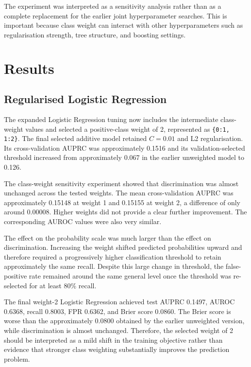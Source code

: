 \documentclass[11pt,a4paper]{article}
\begin{document}
The experiment was interpreted as a sensitivity analysis rather than as a complete replacement for the earlier joint hyperparameter searches. This is important because class weight can interact with other hyperparameters such as regularisation strength, tree structure, and boosting settings.

\section{Results}

\subsection{Regularised Logistic Regression}

The expanded Logistic Regression tuning now includes the intermediate class-weight values and selected a positive-class weight of 2, represented as \texttt{\{0:1, 1:2\}}. The final selected additive model retained $C=0.01$ and L2 regularisation. Its cross-validation AUPRC was approximately 0.1516 and its validation-selected threshold increased from approximately 0.067 in the earlier unweighted model to 0.126.

The class-weight sensitivity experiment showed that discrimination was almost unchanged across the tested weights. The mean cross-validation AUPRC was approximately 0.15148 at weight 1 and 0.15155 at weight 2, a difference of only around 0.00008. Higher weights did not provide a clear further improvement. The corresponding AUROC values were also very similar.

The effect on the probability scale was much larger than the effect on discrimination. Increasing the weight shifted predicted probabilities upward and therefore required a progressively higher classification threshold to retain approximately the same recall. Despite this large change in threshold, the false-positive rate remained around the same general level once the threshold was re-selected for at least 80\% recall.

The final weight-2 Logistic Regression achieved test AUPRC 0.1497, AUROC 0.6368, recall 0.8003, FPR 0.6362, and Brier score 0.0860. The Brier score is worse than the approximately 0.0800 obtained by the earlier unweighted version, while discrimination is almost unchanged. Therefore, the selected weight of 2 should be interpreted as a mild shift in the training objective rather than evidence that stronger class weighting substantially improves the prediction problem.
\end{document}
